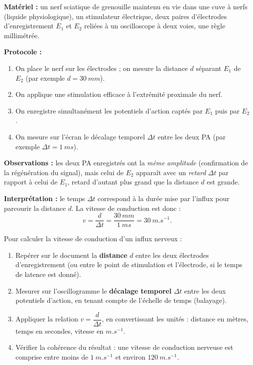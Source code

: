 \documentclass[11pt]{article}
\begin{document}
\begin{experience}
\textbf{Matériel :} un nerf sciatique de grenouille maintenu en vie dans une cuve à nerfs (liquide physiologique), un stimulateur électrique, deux paires d'électrodes d'enregistrement $E_1$ et $E_2$ reliées à un oscilloscope à deux voies, une règle millimétrée.

\textbf{Protocole :}
\begin{enumerate}
\item On place le nerf sur les électrodes ; on mesure la distance $d$ séparant $E_1$ de $E_2$ (par exemple $d = \SI{30}{mm}$).
\item On applique une stimulation efficace à l'extrémité proximale du nerf.
\item On enregistre simultanément les potentiels d'action captés par $E_1$ puis par $E_2$.
\item On mesure sur l'écran le décalage temporel $\Delta t$ entre les deux PA (par exemple $\Delta t = \SI{1}{ms}$).
\end{enumerate}

\textbf{Observations :} les deux PA enregistrés ont la \emph{même amplitude} (confirmation de la régénération du signal), mais celui de $E_2$ apparaît avec un \emph{retard} $\Delta t$ par rapport à celui de $E_1$, retard d'autant plus grand que la distance $d$ est grande.

\textbf{Interprétation :} le temps $\Delta t$ correspond à la durée mise par l'influx pour parcourir la distance $d$. La vitesse de conduction est donc :
\[ v = \frac{d}{\Delta t} = \frac{\SI{30}{mm}}{\SI{1}{ms}} = \SI{30}{m.s^{-1}}. \]
\end{experience}

\begin{methode}
Pour calculer la vitesse de conduction d'un influx nerveux :
\begin{enumerate}
\item Repérer sur le document la \textbf{distance} $d$ entre les deux électrodes d'enregistrement (ou entre le point de stimulation et l'électrode, si le temps de latence est donné).
\item Mesurer sur l'oscillogramme le \textbf{décalage temporel} $\Delta t$ entre les deux potentiels d'action, en tenant compte de l'échelle de temps (balayage).
\item Appliquer la relation $v = \dfrac{d}{\Delta t}$, en convertissant les unités : distance en mètres, temps en secondes, vitesse en $\si{m.s^{-1}}$.
\item Vérifier la cohérence du résultat : une vitesse de conduction nerveuse est comprise entre moins de $\SI{1}{m.s^{-1}}$ et environ $\SI{120}{m.s^{-1}}$.
\end{enumerate}
\end{methode}
\end{document}
